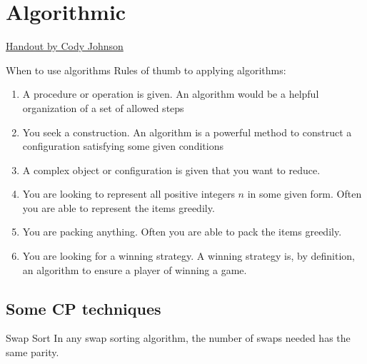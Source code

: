 \graphicspath{{Pics/combi/algo/}}

\newpage
\section{Algorithmic}

\begin{myitemize}{} 
    \item \href{https://people.bath.ac.uk/masgcs/algorithms.pdf}{Handout 
            by Cody Johnson} 
\end{myitemize}

\begin{take_note*}{When to use algorithms}
    Rules of thumb to applying algorithms:
    \begin{enumerate}[left=0pt, label=\boxed{\textbf{\arabic*}}]
        \item A procedure or operation is given. An algorithm would be a
            helpful organization of a set of allowed steps
        \item You seek a construction. An algorithm is a powerful method to
            construct a configuration satisfying some given conditions
        \item A complex object or configuration is given that you want to reduce.
        \item You are looking to represent all positive integers $n$ in
            some given form. Often you are able to represent the items
            greedily.
        \item You are packing anything. Often you are able to pack the items
            greedily.
        \item You are looking for a winning strategy. A winning strategy is,
            by definition, an algorithm to ensure a player of winning a game.
    \end{enumerate}
\end{take_note*}



\subsection{Some CP techniques}

\theo{}
{Swap Sort}{\label{theorem:swap_sort_steps_parity}
    In any swap sorting algorithm, the number of swaps needed has the same parity.
}

